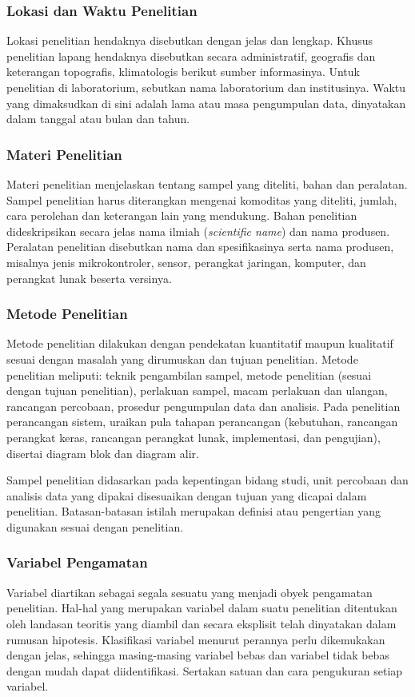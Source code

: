\subsubsection{Lokasi dan Waktu Penelitian}
Lokasi penelitian hendaknya disebutkan dengan jelas dan lengkap. Khusus penelitian lapang hendaknya disebutkan secara administratif, geografis dan keterangan topografis, klimatologis berikut sumber informasinya. Untuk penelitian di laboratorium, sebutkan nama laboratorium dan institusinya. Waktu yang dimaksudkan di sini adalah lama atau masa pengumpulan data, dinyatakan dalam tanggal atau bulan dan tahun.

\subsubsection{Materi Penelitian}
Materi penelitian menjelaskan tentang sampel yang diteliti, bahan dan peralatan. Sampel penelitian harus diterangkan mengenai komoditas yang diteliti, jumlah, cara perolehan dan keterangan lain yang mendukung. Bahan penelitian dideskripsikan secara jelas nama ilmiah (\textit{scientific name}) dan nama produsen. Peralatan penelitian disebutkan nama dan spesifikasinya serta nama produsen, misalnya jenis mikrokontroler, sensor, perangkat jaringan, komputer, dan perangkat lunak beserta versinya.

\subsubsection{Metode Penelitian}
Metode penelitian dilakukan dengan pendekatan kuantitatif maupun kualitatif sesuai dengan masalah yang dirumuskan dan tujuan penelitian. Metode penelitian meliputi: teknik pengambilan sampel, metode penelitian (sesuai dengan tujuan penelitian), perlakuan sampel, macam perlakuan dan ulangan, rancangan percobaan, prosedur pengumpulan data dan analisis. Pada penelitian perancangan sistem, uraikan pula tahapan perancangan (kebutuhan, rancangan perangkat keras, rancangan perangkat lunak, implementasi, dan pengujian), disertai diagram blok dan diagram alir.

Sampel penelitian didasarkan pada kepentingan bidang studi, unit percobaan dan analisis data yang dipakai disesuaikan dengan tujuan yang dicapai dalam penelitian. Batasan-batasan istilah merupakan definisi atau pengertian yang digunakan sesuai dengan penelitian.

\subsubsection{Variabel Pengamatan}
Variabel diartikan sebagai segala sesuatu yang menjadi obyek pengamatan penelitian. Hal-hal yang merupakan variabel dalam suatu penelitian ditentukan oleh landasan teoritis yang diambil dan secara eksplisit telah dinyatakan dalam rumusan hipotesis. Klasifikasi variabel menurut perannya perlu dikemukakan dengan jelas, sehingga masing-masing variabel bebas dan variabel tidak bebas dengan mudah dapat diidentifikasi. Sertakan satuan dan cara pengukuran setiap variabel.

